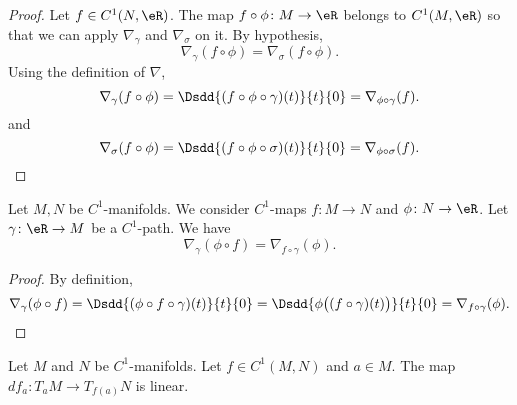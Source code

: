 \begin{proof}
    Let \( f\in C^1(N,\eR)\). The map \( f\circ\phi\colon M\to \eR\) belongs to \( C^1(M,\eR)\) so that we can apply \( \nabla_{\gamma}\) and \( \nabla_{\sigma}\) on it. By hypothesis,
    \begin{equation}
        \nabla_{\gamma}(f\circ \phi)=\nabla_{\sigma}(f\circ \phi).
    \end{equation}
    Using the definition of \( \nabla\),
    \begin{equation}
        \nabla_{\gamma}(f\circ\phi)=\Dsdd{ (f\circ \phi\circ \gamma)(t) }{t}{0}=\nabla_{\phi\circ\gamma}(f).
    \end{equation}
    and
    \begin{equation}
        \nabla_{\sigma}(f\circ\phi)=\Dsdd{ (f\circ \phi\circ \sigma)(t) }{t}{0}=\nabla_{\phi\circ\sigma}(f).
    \end{equation}
\end{proof}

\begin{lemma}        \label{LEMooBOZBooNJMccB}
    Let \( M,N\) be \( C^1\)-manifolds. We consider \( C^1\)-maps \( f\colon M\to N\) and \( \phi\colon N\to \eR\). Let \( \gamma\colon \eR\to M\) be a \( C^1\)-path. We have
    \begin{equation}
        \nabla_{\gamma}(\phi\circ f)=\nabla_{f\circ \gamma}(\phi).
    \end{equation}
\end{lemma}

\begin{proof}
    By definition,
    \begin{equation}
        \nabla_{\gamma}(\phi\circ f)=\Dsdd{ (\phi\circ f\circ \gamma)(t) }{t}{0}=\Dsdd{ \phi\big( (f\circ \gamma)(t) \big) }{t}{0}=\nabla_{f\circ\gamma}(\phi).
    \end{equation}
\end{proof}

\begin{proposition}
    Let \( M\) and \( N\) be \( C^1\)-manifolds. Let \( f\in C^1(M,N)\) and \( a\in M\). The map \( df_a\colon T_aM\to T_{f(a)}N\) is linear.
\end{proposition}

